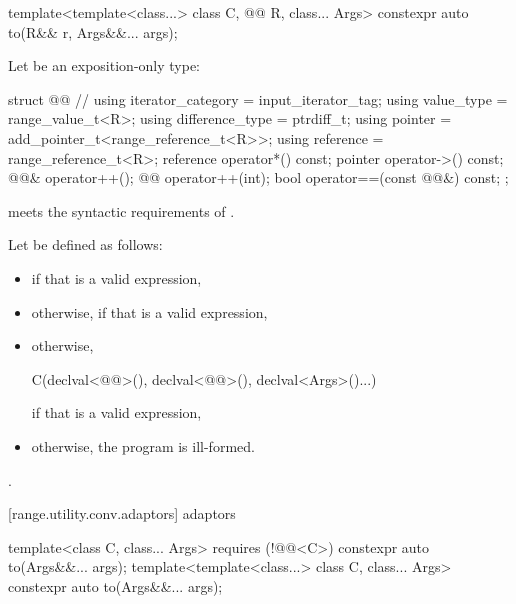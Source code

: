 %
\begin{itemdecl}
template<template<class...> class C, @@ R, class... Args>
  constexpr auto to(R&& r, Args&&... args);
\end{itemdecl}

\begin{itemdescr}
\pnum
Let  be an exposition-only type:
\begin{codeblock}
struct @@ {                        // \expos
  using iterator_category = input_iterator_tag;
  using value_type = range_value_t<R>;
  using difference_type = ptrdiff_t;
  using pointer = add_pointer_t<range_reference_t<R>>;
  using reference = range_reference_t<R>;
  reference operator*() const;
  pointer operator->() const;
  @@& operator++();
  @@ operator++(int);
  bool operator==(const @@&) const;
};
\end{codeblock}
\begin{note}
 meets
the syntactic requirements of .
\end{note}

\pnum
Let  be defined as follows:
\begin{itemize}
\item
{} if that is a valid expression,
\item
otherwise, 
if that is a valid expression,
\item
otherwise,
\begin{codeblock}
C(declval<@@>(), declval<@@>(), declval<Args>()...)
\end{codeblock}
if that is a valid expression,
\item
otherwise, the program is ill-formed.
\end{itemize}

\pnum
\returns
{}.
\end{itemdescr}

[range.utility.conv.adaptors]{ adaptors}

%
\begin{itemdecl}
template<class C, class... Args> requires (!@@<C>)
  constexpr auto to(Args&&... args);
template<template<class...> class C, class... Args>
  constexpr auto to(Args&&... args);
\end{itemdecl}

